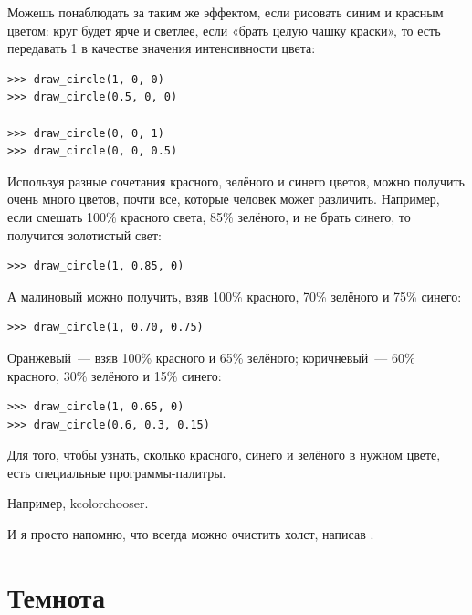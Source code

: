 Можешь понаблюдать за таким же эффектом, если рисовать синим и красным цветом: круг будет ярче и светлее, если «брать целую чашку краски», то есть передавать 1 в качестве значения интенсивности цвета:

\begin{listing}
\begin{verbatim}
>>> draw_circle(1, 0, 0)
>>> draw_circle(0.5, 0, 0)

>>> draw_circle(0, 0, 1)
>>> draw_circle(0, 0, 0.5)
\end{verbatim}
\end{listing}

Используя разные сочетания красного, зелёного и синего цветов, можно получить очень много цветов, почти все, которые человек может различить. Например, если смешать 100\% красного света, 85\% зелёного, и не брать синего, то получится золотистый свет:
\begin{listing}
\begin{verbatim}
>>> draw_circle(1, 0.85, 0)
\end{verbatim}
\end{listing}

А малиновый можно получить, взяв 100\% красного, 70\% зелёного и 75\% синего:

\begin{listing}
\begin{verbatim}
>>> draw_circle(1, 0.70, 0.75)
\end{verbatim}
\end{listing}

Оранжевый — взяв 100\% красного и 65\% зелёного; коричневый — 60\% красного, 30\% зелёного и 15\% синего:

\begin{listing}
\begin{verbatim}
>>> draw_circle(1, 0.65, 0)
>>> draw_circle(0.6, 0.3, 0.15)
\end{verbatim}
\end{listing}

Для того, чтобы узнать, сколько красного, синего и зелёного в нужном цвете, есть специальные программы-палитры. %
\begin{LINUX}
Например, kcolorchooser.
\end{LINUX}

И я просто напомню, что всегда можно очистить холст, написав .

\section{Темнота}

